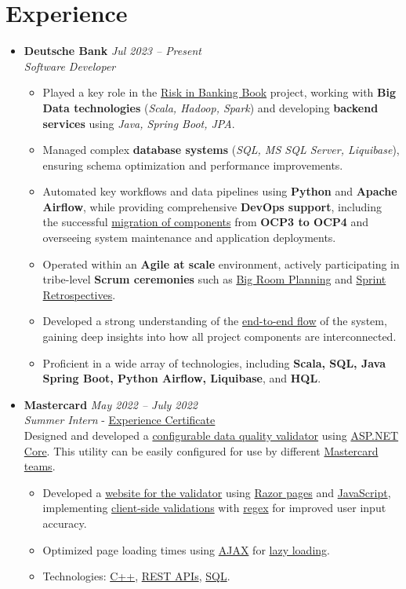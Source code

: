 \documentclass[a4paper,10pt]{article} %
\begin{document}
\section*{Experience}
\begin{itemize}[leftmargin=0.3in, itemsep=0.7pt, topsep=2pt] %
    \item
    \textbf{Deutsche Bank} \hfill \textit{Jul 2023 – Present} \\
    \textit{Software Developer}
    \begin{itemize}[leftmargin=*]
        \item Played a key role in the \underline{Risk in Banking Book} project, working with \textbf{Big Data technologies} (\textit{Scala, Hadoop, Spark}) and developing \textbf{backend services} using \textit{Java, Spring Boot, JPA}.
    \item Managed complex \textbf{database systems} (\textit{SQL, MS SQL Server, Liquibase}), ensuring schema optimization and performance improvements.
    \item Automated key workflows and data pipelines using \textbf{Python} and \textbf{Apache Airflow}, while providing comprehensive \textbf{DevOps support}, including the successful \underline{migration of components} from \textbf{OCP3 to OCP4} and overseeing system maintenance and application deployments.
    \item Operated within an \textbf{Agile at scale} environment, actively participating in tribe-level \textbf{Scrum ceremonies} such as \underline{Big Room Planning} and \underline{Sprint Retrospectives}.
    \item Developed a strong understanding of the \underline{end-to-end flow} of the system, gaining deep insights into how all project components are interconnected.
    \item Proficient in a wide array of technologies, including \textbf{Scala, SQL, Java Spring Boot, Python Airflow, Liquibase}, and \textbf{HQL}.
    \end{itemize}
    \item
    \textbf{Mastercard} \hfill \textit{May 2022 – July 2022} \\
    \textit{Summer Intern} - \href{https://drive.google.com/file/d/1ZbCn1KdSOp6jQ81p2Z8JYz5PDfkcwUmJ/view?usp=sharing}{\underline{Experience Certificate}} 
    \vspace{0.25em}\\
    Designed and developed a \underline{configurable data quality validator} using \underline{ASP.NET Core}. This utility can be easily configured for use by different \underline{Mastercard teams}.
\begin{itemize}[leftmargin=*]
    \item Developed a \underline{website for the validator} using \underline{Razor pages} and \underline{JavaScript}, implementing \underline{client-side validations} with \underline{regex} for improved user input accuracy.
    \item Optimized page loading times using \underline{AJAX} for \underline{lazy loading}.
    \item Technologies: \underline{C++}, \underline{REST APIs}, \underline{SQL}.
\end{itemize}
\end{itemize}
\end{document}
